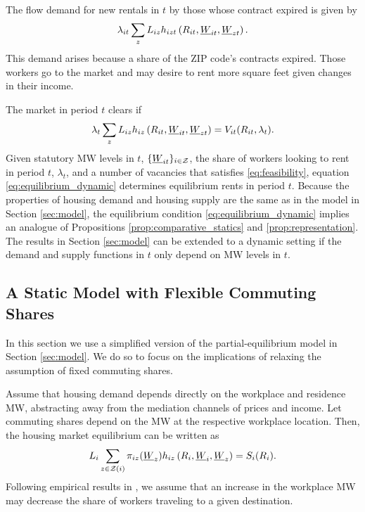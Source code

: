 The flow demand for new rentals in $t$ by those whose contract expired is given 
by
$$
\lambda_{it} \sum_z L_{iz} h_{izt} \left(R_{it}, \underline{W}_{it}, \underline{W}_{zt} \right) .
$$
This demand arises because a share of the ZIP code's contracts expired. 
Those workers go to the market and may desire to rent more square feet given 
changes in their income.

The market in period $t$ clears if
\begin{equation}\label{eq:equilibrium_dynamic}
    \lambda_t \sum_z L_{iz} h_{iz} \left(R_{it}, \underline{W}_{it}, \underline{W}_{zt} \right) = 
    V_{it}(R_{it}, \lambda_t) .
\end{equation}
Given statutory MW levels in $t$, $\{\underline{W}_{it}\}_{i\in\mathcal{Z}}$,
the share of workers looking to rent in period $t$, $\lambda_t$, and 
a number of vacancies that satisfies \eqref{eq:feasibility}, 
equation \eqref{eq:equilibrium_dynamic} determines equilibrium rents in 
period $t$.
Because the properties of housing demand and housing supply are the same as in 
the model in Section \ref{sec:model},
the equilibrium condition \eqref{eq:equilibrium_dynamic} implies an analogue of 
Propositions \ref{prop:comparative_statics} and \ref{prop:representation}.
The results in Section \ref{sec:model} can be extended to a dynamic setting if
the demand and supply functions in $t$ only depend on MW levels in $t$.

\subsection{A Static Model with Flexible Commuting Shares}\label{sec:model_endogenous_shares}

In this section we use a simplified version of the partial-equilibrium model 
in Section \ref{sec:model}.
We do so to focus on the implications of relaxing the assumption of fixed 
commuting shares.

Assume that housing demand depends directly on the workplace and residence MW,
abstracting away from the mediation channels of prices and income.
Let commuting shares depend on the MW at the respective workplace location.
Then, the housing market equilibrium can be written as
\begin{equation}\label{eq:equilibrium_simplified}
	L_i \sum_{z\in\mathcal{Z}(i)} \pi_{iz} (\underline{W}_z) h_{iz} \left(R_i, \underline{W}_i, \underline{W}_z\right) = S_i(R_i) .
\end{equation}
Following empirical results in \textcite{PerezPerez2021}, we assume that 
an increase in the workplace MW may decrease the share of workers traveling to 
a given destination.

